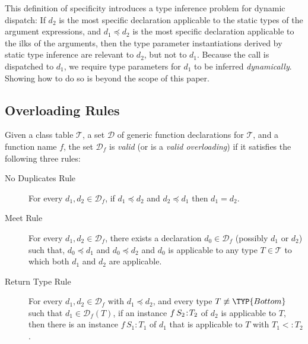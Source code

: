 \documentclass[10pt]{sigplanconf}
\newcommand{\ms}{\preceq}
\newcommand{\decl}[3]{\mbox{\ensuremath{{#1}\,{#2}\!:\!{#3}}}}
\newcommand{\T}{\ensuremath{\mathcal{T}}}
\newcommand{\D}{\ensuremath{\mathcal{D}}}
\newcommand{\Df}[1][f]{\D_{\!#1}}
\newcommand{\Bottom}{\TYP{Bottom}}
\begin{document}
This definition of specificity 
introduces a type inference problem for dynamic dispatch:
If $d_2$ is the most specific declaration applicable 
to the static types of the argument expressions, 
and $d_1 \ms d_2$ is the most specific declaration applicable 
to the ilks of the arguments, 
then the type parameter instantiations derived by static type inference 
are relevant to $d_2$, but not to $d_1$.
Because the call is dispatched to $d_1$, 
we require type parameters for $d_1$ to be inferred \emph{dynamically}.
Showing how to do so
is beyond the scope of this paper.


\subsection{Overloading Rules}
\label{sec:threerules}

Given a class table $\T$, 
a set $\D$ of generic function declarations for $\T$, 
and a function name $f$, 
the set $\Df$ is \emph{valid} 
(or is a \emph{valid overloading}) 
if it 
satisfies the following three rules:


\begin{description}

\item[No Duplicates Rule]
For every $d_1, d_2 \in \Df$, 
if $d_1 \ms d_2$ and $d_2 \ms d_1$ 
then $d_1 = d_2$.

\item[Meet Rule]
For every $d_1, d_2 \in \Df$,
there exists a declaration $d_0 \in \Df$ (possibly $d_1$ or $d_2$) 
such that,
$d_0 \ms d_1$ and $d_0 \ms d_2$ 
and $d_0$ is applicable to any type $T \in \T$ 
to which both $d_1$ and $d_2$ are applicable.

\item[Return Type Rule]
For every $d_1, d_2 \in \Df$ with $d_1 \ms d_2$,
and every type $T \not\equiv \Bottom$ such that $d_1 \in \Df(T)$,
if an instance $\decl{f}{S_2}{T_2}$ of $d_2$ is applicable to $T$,
then there is an instance \decl{f}{S_1}{T_1} of $d_1$
that is applicable to $T$ with \mbox{$T_1 <: T_2$}.

\end{description}
\end{document}
